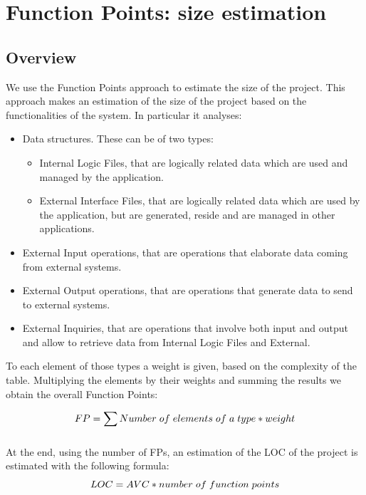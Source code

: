 \section{Function Points: size estimation}
\subsection{Overview}
We use the Function Points approach to estimate the size of the project. This approach makes an estimation of the size of the project based on the functionalities of the system. In particular it analyses:
\begin{itemize}
\item Data structures. These can be of two types:
	\begin{itemize}[label={-}]
	\item Internal Logic Files, that are logically related data which are used and managed by the application.
	\item External Interface Files, that are logically related data which are used by the application, but are generated, reside and are managed in other applications.
	\end{itemize}
\item External Input operations, that are operations that elaborate data coming from external systems.
\item External Output operations, that are operations that generate data to send to external systems.
\item External Inquiries, that are operations that involve both input and output and allow to retrieve data from Internal Logic Files and External.
\end{itemize} 
To each element of those types a weight is given, based on the complexity of the table.\newline
Multiplying the elements by their weights and summing the results we obtain the overall Function Points:\newline

\begin{equation}
FP = \sum_{}{}{Number\hspace{0.1 cm} of\hspace{0.1 cm} elements\hspace{0.1 cm} of\hspace{0.1 cm} a\hspace{0.1 cm} type * weight} 
\end{equation}

At the end, using the number of FPs, an estimation of the LOC of the project is estimated with the following formula:
\begin{equation}
LOC = AVC * number\hspace{0.1 cm} of\hspace{0.1 cm} function\hspace{0.1 cm} points
\end{equation}

